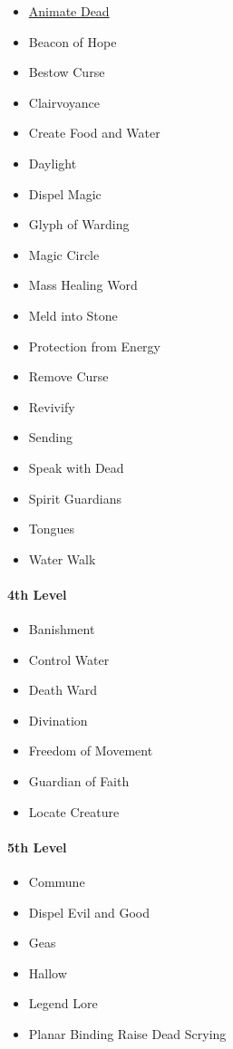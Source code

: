 \begin{itemize}
\item
  \hyperref[spell-animate-dead]{Animate Dead}
\item
  Beacon of Hope
\item
  Bestow Curse
\item
  Clairvoyance
\item
  Create Food and Water
\item
  Daylight
\item
  Dispel Magic
\item
  Glyph of Warding
\item
  Magic Circle
\item
  Mass Healing Word
\item
  Meld into Stone
\item
  Protection from Energy
\item
  Remove Curse
\item
  Revivify
\item
  Sending
\item
  Speak with Dead
\item
  Spirit Guardians
\item
  Tongues
\item
  Water Walk
\end{itemize}

\paragraph{4th Level}\label{_4th_level}

\begin{itemize}
\item
  Banishment
\item
  Control Water
\item
  Death Ward
\item
  Divination
\item
  Freedom of Movement
\item
  Guardian of Faith
\item
  Locate Creature
\end{itemize}

\paragraph{5th Level}\label{_5th_level}

\begin{itemize}
\item
  Commune
\item
  Dispel Evil and Good
\item
  Geas
\item
  Hallow
\item
  Legend Lore
\item
  Planar Binding Raise Dead Scrying
\end{itemize}

